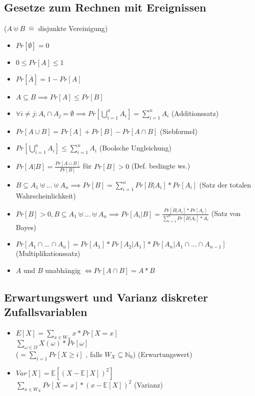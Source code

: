 \documentclass[11pt]{article}
\begin{document}
\subsection{Gesetze zum Rechnen mit Ereignissen}
\label{sec:org040514a}
(\(A \uplus B \ \hat{=}\) disjunkte Vereinigung)
\begin{itemize}
\item \(Pr[\emptyset] = 0\)
\item \(0 \leq Pr[A] \leq 1\)
\item \(Pr[\overline{A}] = 1 - Pr[A]\)
\item \(A \subseteq B \implies Pr[A] \leq Pr[B]\)
\item \(\forall i \neq j: A_i \cap A_j = \emptyset \implies Pr[\bigcup_{i=1}^n A_i] = \sum_{i=1}^n A_i\) (Additionssatz)
\item \(Pr[A \cup B] = Pr[A] + Pr[B] - Pr[A \cap B]\) (Siebformel)
\item \(Pr[\bigcup_{i=1}^n A_i] \leq \sum_{i=1}^n A_i\) (Boolsche Ungleichung)
\item \(Pr[A|B] = \frac{Pr[A \cup B]}{Pr[B]}\) für \(Pr[B] > 0\) (Def. bedingte ws.)
\item \(B \subseteq A_1 \uplus ... \uplus A_n \implies Pr[B] = \sum_{i=1}^n Pr[B|A_i] * Pr[A_i]\) (Satz der totalen Wahrscheinlichkeit)
\item \(Pr[B] > 0, B \subseteq A_1 \uplus ... \uplus A_n \implies Pr[A_i|B] = \frac{Pr[B|A_i] * Pr[A_i]}{\sum_{i=1}^nPr[B|A_i] * A_i}\) (Satz von Bayes)
\item \(Pr[A_1 \cap ... \cap A_n] = Pr[A_1] * Pr[A_2|A_1] * Pr[A_n | A_1 \cap ... \cap A_{n-1}]\) (Multiplikationssatz)
\item \(A\) und \(B\) unabhängig \(\iff Pr[A \cap B] = A * B\)
\end{itemize}
\subsection{Erwartungswert und Varianz diskreter Zufallsvariablen}
\label{sec:org9262400}
\begin{itemize}
\item \(E[X] = \sum_{x \in W_X} x * Pr[X = x]\) \\
\(\sum_{\omega \in \Omega} X(\omega) * Pr[\omega]\) \\
(\(= \sum_{i=1} Pr[X \geq i]\) , falls \(W_X \subseteq \mathbb{N}_0\)) (Erwartungswert)
\item \(Var[X] = \mathbb{E}[(X - \mathbb{E}[X])^2]\) \\
\(\sum_{x \in W_X} Pr[X = x] * (x - \mathbb{E}[X])^2\) (Varianz)
\end{itemize}
\end{document}
